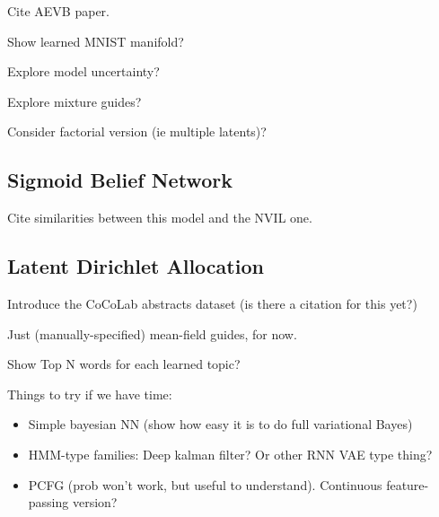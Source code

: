 Cite AEVB paper.

Show learned MNIST manifold?

Explore model uncertainty?

Explore mixture guides?

Consider factorial version (ie multiple latents)?


\subsection{Sigmoid Belief Network}
\label{sec:results_sbn}

Cite similarities between this model and the NVIL one.


\subsection{Latent Dirichlet Allocation}
\label{sec:results_lda}

Introduce the CoCoLab abstracts dataset (is there a citation for this yet?)

Just (manually-specified) mean-field guides, for now.

Show Top N words for each learned topic?


Things to try if we have time:
\begin{itemize}
\item{Simple bayesian NN (show how easy it is to do full variational Bayes)}
\item{HMM-type families: Deep kalman filter? Or other RNN VAE type thing?}
\item{PCFG (prob won’t work, but useful to understand). Continuous feature-passing version?}
\end{itemize}

